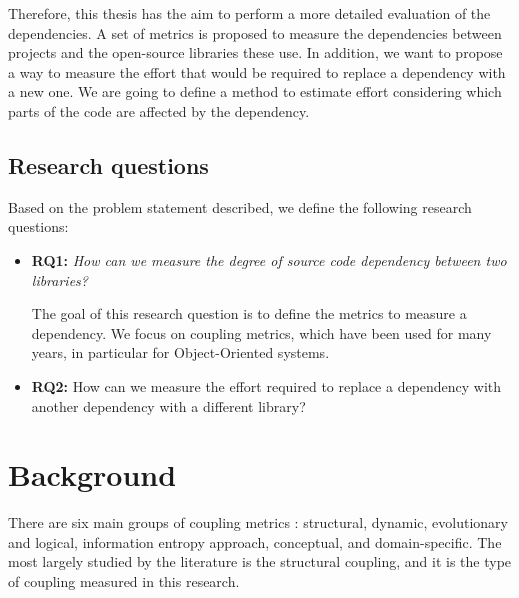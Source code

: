 \documentclass[a4paper]{article}
\begin{document}
Therefore, this thesis has the aim to perform a more detailed evaluation of the dependencies. A set of metrics is proposed to measure the dependencies between projects and the open-source libraries these use. In addition, we want to propose a way to measure the effort that would be required to replace a dependency with a new one. We are going to define a method to estimate effort considering which parts of the code are affected by the dependency.

\subsection{Research questions}
Based on the problem statement described, we define the following research questions:

\begin{itemize}[noitemsep]
  \item \textbf{RQ1:} \textit{How can we measure the degree of source code dependency between two libraries?}

  The goal of this research question is to define the metrics to measure a dependency. We focus on coupling metrics, which have been used for many years, in particular for Object-Oriented systems.

  \item \textbf{RQ2:} How can we measure the effort required to replace a dependency with another dependency with a different library?
\end{itemize}

\section{Background}
There are six main groups of coupling metrics \cite{poshyvanyk2006conceptual}: structural, dynamic, evolutionary and logical, information entropy approach, conceptual, and domain-specific. The most largely studied by the literature is the structural coupling, and it is the type of coupling measured in this research.
\end{document}
